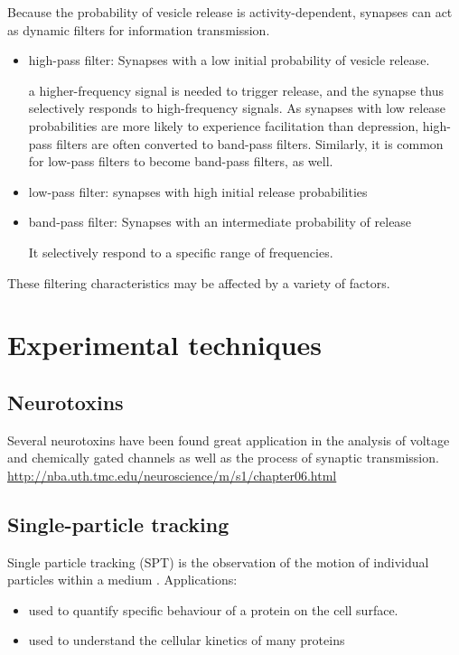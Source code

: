 Because the probability of vesicle release is activity-dependent, synapses can
act as dynamic filters for information transmission.
\begin{itemize}
  \item high-pass filter:  Synapses with a low initial probability of vesicle
  release.
  
  a higher-frequency signal is needed to trigger release, and the synapse thus
  selectively responds to high-frequency signals.
  As synapses with low release probabilities are more likely to experience
  facilitation than depression,
  high-pass filters are often converted to band-pass filters.
  Similarly,  it is common for low-pass filters to become band-pass filters, as
  well. 
  
  \item low-pass filter: synapses with high initial release probabilities
  
  \item band-pass filter: Synapses with an intermediate probability of release 
  
  It selectively respond to a specific range of frequencies. 
  
  
\end{itemize}
These filtering characteristics may be affected by a variety of factors.



\section{Experimental techniques}

\subsection{Neurotoxins}

Several neurotoxins have been found great application in the analysis of voltage
and chemically gated channels as well as the process of synaptic transmission.
\url{http://nba.uth.tmc.edu/neuroscience/m/s1/chapter06.html}

\subsection{Single-particle tracking}
\label{sec:SPT}
\label{sec:single-particle-tracking}


Single particle tracking (SPT) is the observation of the motion of individual
particles within a medium \citep{qian1991,saxton1997}. Applications:
\begin{itemize}
  \item used to quantify specific behaviour of a
  protein on the cell surface. 
  
  \item used to understand the cellular kinetics of many proteins 
\end{itemize}

